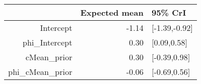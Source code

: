 \begin{tabular}{rrl}
  \hline
 & Expected mean & 95\% CrI \\ 
  \hline
Intercept & -1.14 & [-1.39,-0.92] \\ 
  phi\_Intercept & 0.30 & [0.09,0.58] \\ 
  cMean\_prior & 0.30 & [-0.39,0.98] \\ 
  phi\_cMean\_prior & -0.06 & [-0.69,0.56] \\ 
   \hline
\end{tabular}

